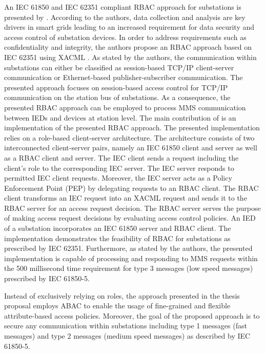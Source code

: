 An IEC 61850 and IEC 62351 compliant RBAC approach for substations is presented by \citeauthor{Lee2015} \cite{Lee2015}.
According to the authors, data collection and analysis are key drivers in smart grids leading to an increased requirement for data security and access control of substation devices.
In order to address requirements such as confidentiality and integrity, the authors propose an RBAC approach based on IEC 62351 using XACML \cite{Oasis2013}.
As stated by the authors, the communication within substations can either be classified as session-based TCP/IP client-server communication or Ethernet-based publisher-subscriber communication.
The presented approach focuses on session-based access control for TCP/IP communication on the station bus of substations.
As a consequence, the presented RBAC approach can be employed to process MMS communication between IEDs and devices at station level.
The main contribution of \citeauthor{Lee2015} is an implementation of the presented RBAC approach.
The presented implementation relies on a role-based client-server architecture.
The architecture consists of two interconnected client-server pairs, namely an IEC 61850 client and server as well as a RBAC client and server.
The IEC client sends a request including the client's role to the corresponding IEC server.
The IEC server responds to permitted IEC client requests.
Moreover, the IEC server acts as a Policy Enforcement Point (PEP) by delegating requests to an RBAC client.
The RBAC client transforms an IEC request into an XACML request and sends it to the RBAC server for an access request decision.
The RBAC server serves the purpose of making access request decisions by evaluating access control policies.
An IED of a substation incorporates an IEC 61850 server and RBAC client.
The implementation demonstrates the feasibility of RBAC for substations as prescribed by IEC 62351.
Furthermore, as stated by the authors, the presented implementation is capable of processing and responding to MMS requests within the 500 millisecond time requirement for type 3 messages (low speed messages) prescribed by IEC 61850-5.

Instead of exclusively relying on roles, the approach presented in the thesis proposal employs ABAC to enable the usage of fine-grained and flexible attribute-based access policies.
Moreover, the goal of the proposed approach is to secure any communication within substations including type 1 messages (fast messages) and type 2 messages (medium speed messages) as described by IEC 61850-5.

